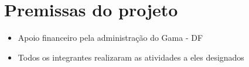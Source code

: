 \section{Premissas do projeto}

  \begin{itemize}
    \item Apoio financeiro pela administração do Gama - DF
    \item Todos os integrantes realizaram as atividades a eles designados
  \end{itemize}
